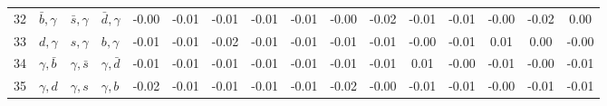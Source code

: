 \begin{tabularx}{\textwidth}{rXXX@{}S@{}S@{}S@{}S@{}S@{}S@{}S@{}S@{}S@{}S@{}S@{}S}
 32 & $\bar b,\gamma$  & $\bar s,\gamma$  & $\bar d,\gamma$ & -0.00 & -0.01 & -0.01 & -0.01 & -0.01 & -0.00 & -0.02 & -0.01 & -0.01 & -0.00 & -0.02 &  0.00 \\
 33 & $d,\gamma$       & $s,\gamma$       & $b,\gamma$      & -0.01 & -0.01 & -0.02 & -0.01 & -0.01 & -0.01 & -0.01 & -0.00 & -0.01 &  0.01 &  0.00 & -0.00 \\
 34 & $\gamma,\bar b$  & $\gamma,\bar s$  & $\gamma,\bar d$ & -0.01 & -0.01 & -0.01 & -0.01 & -0.01 & -0.01 & -0.01 &  0.01 & -0.00 & -0.01 & -0.00 & -0.01 \\
 35 & $\gamma,d$       & $\gamma,s$       & $\gamma, b$     & -0.02 & -0.01 & -0.01 & -0.01 & -0.01 & -0.02 & -0.00 & -0.01 & -0.01 & -0.00 & -0.01 & -0.01 \\
 \bottomrule
\end{tabularx}
